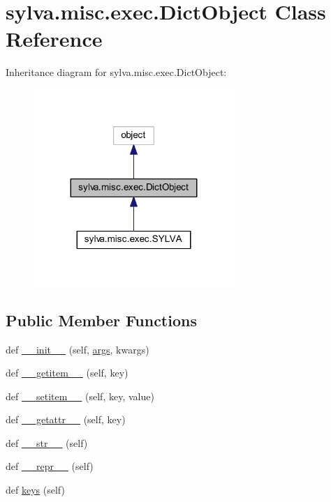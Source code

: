\hypertarget{classsylva_1_1misc_1_1exec_1_1_dict_object}{}\section{sylva.\+misc.\+exec.\+Dict\+Object Class Reference}
\label{classsylva_1_1misc_1_1exec_1_1_dict_object}


Inheritance diagram for sylva.\+misc.\+exec.\+Dict\+Object\+:\nopagebreak
\begin{figure}[H]
\begin{center}
\leavevmode
\includegraphics[width=215pt]{classsylva_1_1misc_1_1exec_1_1_dict_object__inherit__graph}
\end{center}
\end{figure}
\subsection*{Public Member Functions}
\begin{DoxyCompactItemize}
\item 
def \hyperlink{classsylva_1_1misc_1_1exec_1_1_dict_object_acd7ac78ad80858775f4752edab3bb9f0}{\+\_\+\+\_\+init\+\_\+\+\_\+} (self, \hyperlink{namespacesylva_1_1misc_1_1exec_a4e70593929af3f6aa7fa94d0b4318766}{args}, kwargs)
\item 
def \hyperlink{classsylva_1_1misc_1_1exec_1_1_dict_object_ab360685e86a5d323b99adcde29546ebb}{\+\_\+\+\_\+getitem\+\_\+\+\_\+} (self, key)
\item 
def \hyperlink{classsylva_1_1misc_1_1exec_1_1_dict_object_a219a0c8ab7c1f0a05a76c5c79f86fe59}{\+\_\+\+\_\+setitem\+\_\+\+\_\+} (self, key, value)
\item 
def \hyperlink{classsylva_1_1misc_1_1exec_1_1_dict_object_a194306589e55ae82911d017462eb5f8e}{\+\_\+\+\_\+getattr\+\_\+\+\_\+} (self, key)
\item 
def \hyperlink{classsylva_1_1misc_1_1exec_1_1_dict_object_a7c974971714369cdba35b66479addd71}{\+\_\+\+\_\+str\+\_\+\+\_\+} (self)
\item 
def \hyperlink{classsylva_1_1misc_1_1exec_1_1_dict_object_a50fd48db155e090c3fb26a50e2999a95}{\+\_\+\+\_\+repr\+\_\+\+\_\+} (self)
\item 
def \hyperlink{classsylva_1_1misc_1_1exec_1_1_dict_object_a8a81846b980700e7552d76f4fa1eff1e}{keys} (self)
\end{DoxyCompactItemize}


